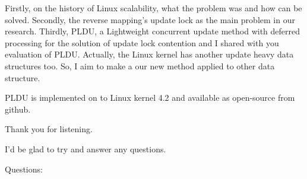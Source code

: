 Firstly, on the history of Linux scalability, what the problem was and how can
be solved.
Secondly, the reverse mapping's update lock as the main problem in our research.
Thirdly, PLDU, a Lightweight concurrent update method with deferred processing
for the solution of update lock contention and I shared with you evaluation of
PLDU.
Actually, the Linux kernel has another update heavy data structures too.
So, I aim to make a our new method applied to other data structure.

PLDU is implemented on to Linux kernel 4.2 and available as open-source from
github.

Thank you for listening.

I'd be glad to try and answer any questions.

Questions:

